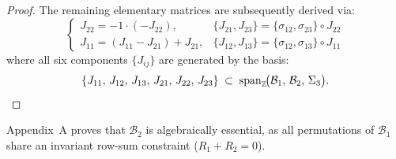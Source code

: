 \documentclass[sigconf,review,anonymous]{acmart}
\theoremstyle{definition}
\newcommand{\calB}{\mathcal{B}}
\begin{document}
\begin{proof}
The remaining elementary matrices are subsequently derived via:
\begin{equation}
\label{eq:all_eij_gen}
\begin{cases}
J_{22} = -1 \cdot (-J_{22}), & \{J_{21}, J_{23}\} = \{\sigma_{12}, \sigma_{23}\} \circ J_{22} \\
J_{11} = (J_{11} - J_{21}) + J_{21}, & \{J_{12}, J_{13}\} = \{\sigma_{12}, \sigma_{13}\} \circ J_{11}
\end{cases}
\end{equation}
where all six components $\{J_{ij}\}$ are generated by the basis:
\begin{equation}
\{J_{11},\, J_{12},\, J_{13},\, J_{21},\, J_{22},\, J_{23}\} \;\subset\; \operatorname{span}_{\mathbb{Z}}\!\bigl(\calB_1,\, \calB_2,\, \Sigma_3\bigr). \qedhere
\label{eq:all_eij}
\end{equation}
\end{proof}

\noindent Appendix~A proves that $\calB_2$ is algebraically essential, as all permutations of $\calB_1$ share an invariant row-sum constraint ($R_1 + R_2 = 0$).
\end{document}
